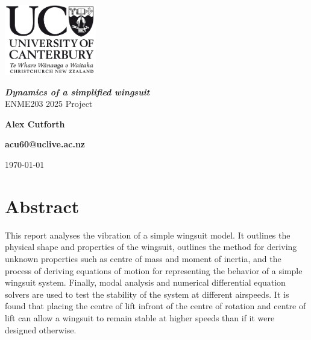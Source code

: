 \documentclass[11pt]{article}
\begin{document}
\begin{titlepage}
\hfill\includegraphics[width=40mm]{UCLogo.png}
\begin{center}

\vspace*{\fill}

\textbf{\huge{\textsl{Dynamics of a simplified wingsuit}}}\\
ENME203 2025 Project
\vspace*{\fill}


\textbf{\large Alex Cutforth}

\textbf{\large acu60@uclive.ac.nz}

\vspace*{\fill}

\textnormal{\large \today}

\end{center}
\end{titlepage}

\section*{Abstract}
This report analyses the vibration of a simple wingsuit model.
It outlines the physical shape and properties of the wingsuit, outlines the method for deriving unknown properties such as centre of mass and moment of inertia, and the process of deriving equations of motion for representing the behavior of a simple wingsuit system.
Finally, modal analysis and numerical differential equation solvers are used to test the stability of the system at different airspeeds.
It is found that placing the centre of lift infront of the centre of rotation and centre of lift can allow a wingsuit to remain stable at higher speeds than if it were designed otherwise.


\end{document}
